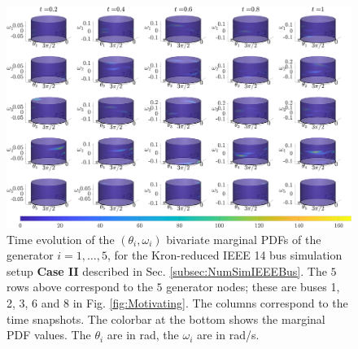 \documentclass[10pt,twocolumn]{IEEEtran}
\begin{document}
\begin{figure}[t]
\centering
\includegraphics[width=0.9\linewidth]{IEEE14marginalsCase1.png}
\caption{\small{Time evolution of the $(\theta_{i},\omega_{i})$ bivariate marginal PDFs of the generator $i=1,\hdots,5$, for the Kron-reduced IEEE 14 bus simulation setup \textbf{Case II} described in Sec. \ref{subsec:NumSimIEEEBus}. The $5$ rows above correspond to the $5$ generator nodes; these are buses 1, 2, 3, 6 and 8 in Fig. \ref{fig:Motivating}. The columns correspond to the time snapshots. The colorbar at the bottom shows the marginal PDF values. The $\theta_i$ are in rad, the $\omega_i$ are in rad/s.}}
\vspace*{-0.1in}
\label{fig:IEEE14marginalsCase1}
\end{figure}
\end{document}
